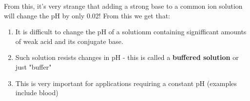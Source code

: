 \documentclass{article}  %
\begin{document}
From this, it's very strange that adding a strong base to a common ion solution will change the pH by only 0.02! From this we get that:
\begin{enumerate}
    \item It is difficult to change the pH of a solutionm containing signifficant amounts of weak acid and its conjugate base.
    \item Such solution resists changes in pH - this is called a \textbf{buffered solution} or just "buffer"
    \item This is very important for applications requiring a constant pH (examples include blood)
\end{enumerate}
\end{document}
